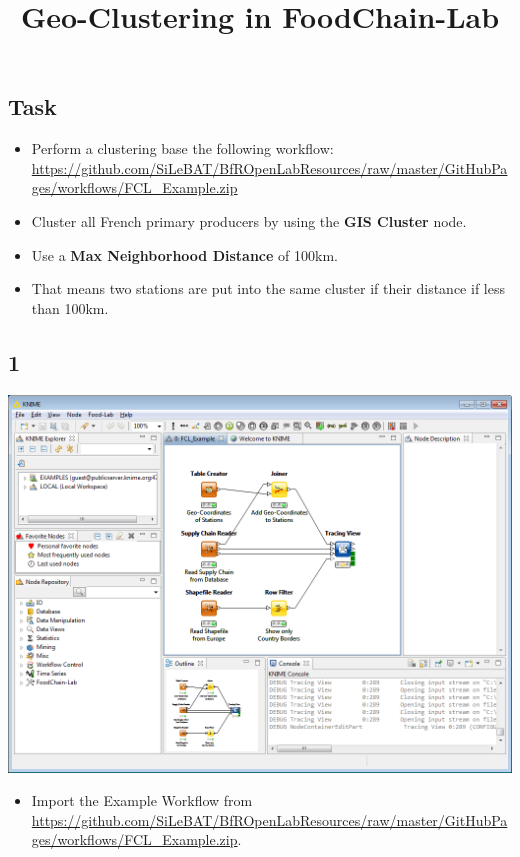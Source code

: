 \documentclass{beamer}
\title{Geo-Clustering in FoodChain-Lab}
\date{}
\begin{document}
\maketitle

\section{ }

\subsection{Task}
\begin{frame}
	\begin{itemize}
		\item Perform a clustering base the following workflow: \url{https://github.com/SiLeBAT/BfROpenLabResources/raw/master/GitHubPages/workflows/FCL_Example.zip}
		\item Cluster all French primary producers by using the \textbf{GIS Cluster} node.
		\item Use a \textbf{Max Neighborhood Distance} of 100km.
		\item That means two stations are put into the same cluster if their distance if less than 100km.
	\end{itemize}
\end{frame}
 
\subsection{1}
\begin{frame}
	\begin{center}
  		\includegraphics[height=0.6\textheight]{1.png}
	\end{center}
	\begin{itemize}
		\item Import the Example Workflow from \url{https://github.com/SiLeBAT/BfROpenLabResources/raw/master/GitHubPages/workflows/FCL_Example.zip}.
	\end{itemize}
\end{frame}
\end{document}
